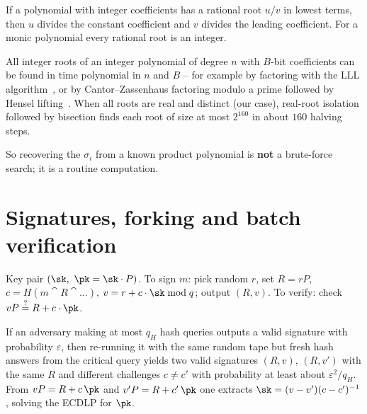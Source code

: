 \begin{theorem}\label{thm:rrt}
If a polynomial with integer coefficients has a rational root $u/v$ in lowest terms, then $u$ divides the constant coefficient and $v$ divides the leading
coefficient. For a monic polynomial every rational root is an integer.
\end{theorem}

\begin{proposition}\label{prop:roots}
All integer roots of an integer polynomial of degree $n$ with $B$-bit coefficients can be found in time polynomial in $n$ and $B$ -- for example by
factoring with the LLL algorithm~\cite{lll}, or by Cantor--Zassenhaus factoring modulo a prime followed by Hensel lifting~\cite{cz}. When all roots are
real and distinct (our case), real-root isolation followed by bisection finds each root of size at most $2^{160}$ in about $160$ halving steps.
\end{proposition}
\noindent So recovering the $\sigma_i$ from a known product polynomial is \textbf{not} a brute-force search; it is a routine computation.

\section{Signatures, forking and batch verification}
\begin{definition}
Key pair $(\sk,\ \pk=\sk\cdot P)$. To sign $m$: pick random $r$, set $R=rP$, $c=H(m\cat R\cat\dots)$, $v=r+c\cdot\sk\bmod q$; output $(R,v)$.
To verify: check $vP\overset{?}{=}R+c\cdot\pk$.
\end{definition}

\begin{lemma}\label{lem:fork}
If an adversary making at most $q_H$ hash queries outputs a valid signature with probability $\varepsilon$, then re-running it with the same random tape
but fresh hash answers from the critical query yields two valid signatures $(R,v)$, $(R,v')$ with the same $R$ and different challenges $c\neq c'$ with
probability at least about $\varepsilon^2/q_H$. From $vP=R+c\,\pk$ and $v'P=R+c'\,\pk$ one extracts $\sk=(v-v')(c-c')^{-1}$, solving the ECDLP for $\pk$.
\end{lemma}

